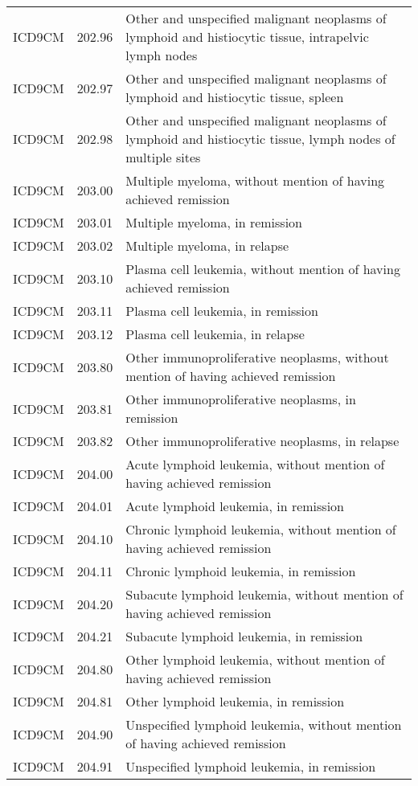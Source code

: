 \begin{longtable}{p{}p{}p{}}
  ICD9CM & 202.96 & Other and unspecified malignant neoplasms of lymphoid and histiocytic tissue, intrapelvic lymph nodes \\ 
  ICD9CM & 202.97 & Other and unspecified malignant neoplasms of lymphoid and histiocytic tissue, spleen \\ 
  ICD9CM & 202.98 & Other and unspecified malignant neoplasms of lymphoid and histiocytic tissue, lymph nodes of multiple sites \\ 
  ICD9CM & 203.00 & Multiple myeloma, without mention of having achieved remission \\ 
  ICD9CM & 203.01 & Multiple myeloma, in remission \\ 
  ICD9CM & 203.02 & Multiple myeloma, in relapse \\ 
  ICD9CM & 203.10 & Plasma cell leukemia, without mention of having achieved remission \\ 
  ICD9CM & 203.11 & Plasma cell leukemia, in remission \\ 
  ICD9CM & 203.12 & Plasma cell leukemia, in relapse \\ 
  ICD9CM & 203.80 & Other immunoproliferative neoplasms, without mention of having achieved remission \\ 
  ICD9CM & 203.81 & Other immunoproliferative neoplasms, in remission \\ 
  ICD9CM & 203.82 & Other immunoproliferative neoplasms, in relapse \\ 
  ICD9CM & 204.00 & Acute lymphoid leukemia, without mention of having achieved remission \\ 
  ICD9CM & 204.01 & Acute lymphoid leukemia, in remission \\ 
  ICD9CM & 204.10 & Chronic lymphoid leukemia, without mention of having achieved remission \\ 
  ICD9CM & 204.11 & Chronic lymphoid leukemia, in remission \\ 
  ICD9CM & 204.20 & Subacute lymphoid leukemia, without mention of having achieved remission \\ 
  ICD9CM & 204.21 & Subacute lymphoid leukemia, in remission \\ 
  ICD9CM & 204.80 & Other lymphoid leukemia, without mention of having achieved remission \\ 
  ICD9CM & 204.81 & Other lymphoid leukemia, in remission \\ 
  ICD9CM & 204.90 & Unspecified lymphoid leukemia, without mention of having achieved remission \\ 
  ICD9CM & 204.91 & Unspecified lymphoid leukemia, in remission \\ 

\end{longtable}
